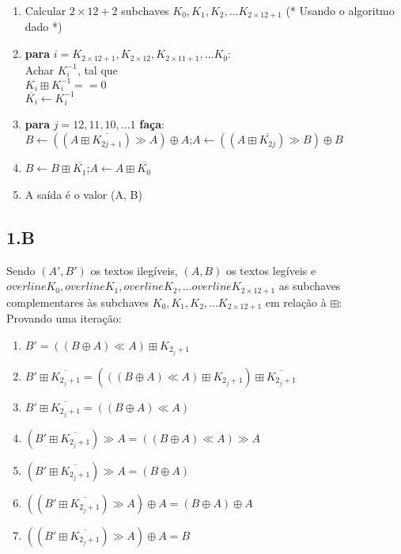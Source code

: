 \documentclass[12pt,letterpaper]{article}
\begin{document}
\begin{enumerate}
    \item Calcular $2 \times 12 + 2$ subchaves $K_0, K_1, K_2,... K_{2 \times 12 + 1}$ (* Usando o algoritmo dado *)

    \item \textbf{para} $i = K_{2 \times 12 + 1}, K_{2 \times 12}, K_{2 \times 11 + 1},...K_{0}$: \\
        Achar $K_i^{-1}$, tal que \\
        $K_i \boxplus K_i^{-1} == 0$ \\
        $\overline{K_i} \leftarrow K_i^{-1}$

    \item \textbf{para} $j = 12, 11, 10,...1$ \textbf{faça}: \\
        $B \leftarrow ((A \boxplus \overline{K_{2j+1}}) \gg A) \oplus A$;$A \leftarrow ((A \boxplus \overline{K_{2j}}) \gg B) \oplus B$
    \item $B \leftarrow B \boxplus \overline{K_1}$;$A \leftarrow A \boxplus \overline{K_0}$
    \item A saída é o valor (A, B)
\end{enumerate}

\subsection*{1.B}
    Sendo $(A', B')$ os textos ilegíveis, $(A,B)$ os textos legíveis e $overline{K_0}, overline{K_1}, overline{K_2},...overline{K_{2 \times 12 + 1}}$ as subchaves complementares às subchaves $K_0, K_1, K_2,... K_{2 \times 12 + 1}$ em relação à $\boxplus$: \\
    Provando uma iteração:

\begin{enumerate}
    \item $B' = ((B \oplus A) \ll A) \boxplus K_{2_j + 1}$
    \item $B' \boxplus  \overline{K_{2_j + 1}} = (((B \oplus A) \ll A) \boxplus K_{2_j + 1}) \boxplus  \overline{K_{2_j + 1}}$
    \item $B' \boxplus \overline{K_{2_j + 1}} = ((B \oplus A) \ll A) $
    \item $(B' \boxplus \overline{K_{2_j + 1}}) \gg A = ((B \oplus A) \ll A) \gg A$
    \item $(B' \boxplus \overline{K_{2_j + 1}}) \gg A = (B \oplus A)$
    \item $((B' \boxplus \overline{K_{2_j + 1}}) \gg A) \oplus A = (B \oplus A) \oplus A$
    \item $((B' \boxplus \overline{K_{2_j + 1}}) \gg A) \oplus A = B$
\end{enumerate}
\end{document}
